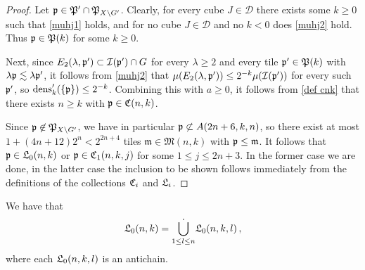 \begin{proof}
    Let $\mathfrak p \in \mathfrak P' \cap \mathfrak P_{X \setminus G'}$. Clearly, for every cube $J \in \mathcal{D}$ there exists some $k \ge 0$ such that \eqref{muhj1} holds, and for no cube $J \in \mathcal{D}$ and no $k < 0$ does \eqref{muhj2} hold. Thus $\mathfrak p \in \mathfrak P(k)$ for some $k \ge 0$.

    Next, since $E_2(\lambda, \mathfrak p') \subset \mathcal{I}(\mathfrak p')\cap G$ for every $\lambda \ge 2$ and every tile $\mathfrak p' \in \mathfrak P(k)$ with $\lambda\mathfrak p \lesssim \lambda \mathfrak p'$, it follows from \eqref{muhj2} that $\mu(E_2(\lambda, \mathfrak p')) \le 2^{-k} \mu(\mathcal{I}(\mathfrak p'))$ for every such $\mathfrak p'$, so $\operatorname{\operatorname{dens}}_k'(\{\mathfrak p\}) \le 2^{-k}$. Combining this with $a \ge 0$, it follows from \eqref{def cnk} that there exists $n\ge k$ with $\mathfrak p \in \mathfrak C(n,k)$.

    Since $\mathfrak p \not \in \mathfrak P_{X \setminus G'}$, we have in particular $\mathfrak p \not \subset A(2n + 6, k, n)$, so there exist at most $1 + (4n + 12)2^n < 2^{2n+4}$ tiles $\mathfrak{m} \in \mathfrak{M}(n,k)$ with $\mathfrak p \le \mathfrak{m}$. It follows that $\mathfrak p \in \mathfrak L_0(n,k)$ or $\mathfrak p \in \mathfrak C_1(n,k,j)$ for some $1 \le j \le 2n + 3$. In the former case we are done, in the latter case the inclusion to be shown follows immediately from the definitions of the collections $\mathfrak C_i$ and $\mathfrak L_i$.
\end{proof}

\begin{lemma}
    We have that
    $$
        \mathfrak L_0(n,k) = \dot{\bigcup_{1 \le l \le n}} \mathfrak L_0(n,k,l)\,,
    $$
    where each $\mathfrak L_0(n,k,l)$ is an antichain.
\end{lemma}

